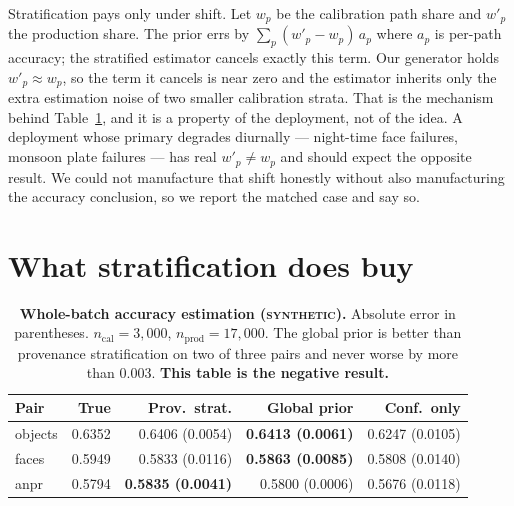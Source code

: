 \documentclass[11pt,a4paper]{article}
\newcommand{\synth}{\textsc{synthetic}}
\begin{document}
Stratification pays only under shift. Let $w_p$ be the calibration path share and
$w'_p$ the production share. The prior errs by
$\sum_p (w'_p - w_p)\,a_p$ where $a_p$ is per-path accuracy; the stratified
estimator cancels exactly this term. Our generator holds $w'_p \approx w_p$, so
the term it cancels is near zero and the estimator inherits only the extra
estimation noise of two smaller calibration strata. That is the mechanism behind
Table~\ref{tab:estimation}, and it is a property of the deployment, not of the
idea. A deployment whose primary degrades diurnally --- night-time face failures,
monsoon plate failures --- has real $w'_p \neq w_p$ and should expect the opposite
result. We could not manufacture that shift honestly without also manufacturing
the accuracy conclusion, so we report the matched case and say so.

\section{What stratification does buy}
\label{sec:buys}

\begin{table}[t]
\centering\small
\begin{tabular}{lrrrr}
\toprule
\textbf{Pair} & \textbf{True} & \textbf{Prov.\ strat.} & \textbf{Global prior} & \textbf{Conf.\ only} \\
\midrule
objects & 0.6352 & 0.6406 \;(0.0054) & \textbf{0.6413 \;(0.0061)} & 0.6247 \;(0.0105) \\
faces   & 0.5949 & 0.5833 \;(0.0116) & \textbf{0.5863 \;(0.0085)} & 0.5808 \;(0.0140) \\
anpr    & 0.5794 & \textbf{0.5835 \;(0.0041)} & 0.5800 \;(0.0006) & 0.5676 \;(0.0118) \\
\bottomrule
\end{tabular}
\caption{\textbf{Whole-batch accuracy estimation (\synth).} Absolute error in
parentheses. $n_{\text{cal}}=3{,}000$, $n_{\text{prod}}=17{,}000$. The global prior
is better than provenance stratification on two of three pairs and never worse by
more than $0.003$. \textbf{This table is the negative result.}}
\label{tab:estimation}
\end{table}
\end{document}
